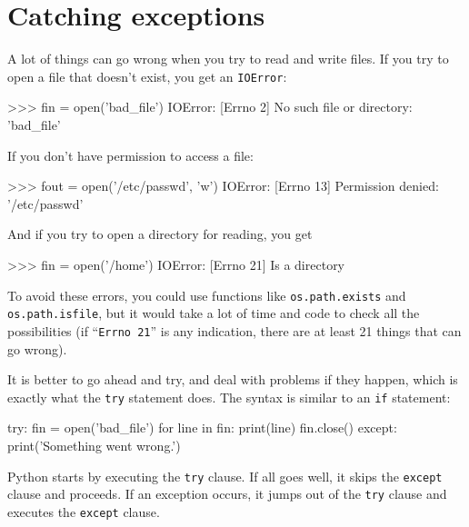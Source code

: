 \section{Catching exceptions}
\label{catch}

A lot of things can go wrong when you try to read and write
files.  If you try to open a file that doesn't exist, you get an
{\tt IOError}:


\beforeverb
\begin{pyinterpreter}
>>> fin = open('bad_file')
IOError: [Errno 2] No such file or directory: 'bad_file'
\end{pyinterpreter}
\afterverb
%
If you don't have permission to access a file:


\beforeverb
\begin{pyinterpreter}
>>> fout = open('/etc/passwd', 'w')
IOError: [Errno 13] Permission denied: '/etc/passwd'
\end{pyinterpreter}
\afterverb
%
And if you try to open a directory for reading, you get

\beforeverb
\begin{pyinterpreter}
>>> fin = open('/home')
IOError: [Errno 21] Is a directory
\end{pyinterpreter}
\afterverb
%
To avoid these errors, you could use functions like {\tt os.path.exists}
and {\tt os.path.isfile}, but it would take a lot of time and code
to check all the possibilities (if ``{\tt Errno 21}'' is any
indication, there are at least 21 things that can go wrong).


It is better to go ahead and try, and deal with problems if they
happen, which is exactly what the {\tt try} statement does.  The
syntax is similar to an {\tt if} statement:

\beforeverb
\begin{pycode}
try:    
    fin = open('bad_file')
    for line in fin:
        print(line)
    fin.close()
except:
    print('Something went wrong.')
\end{pycode}
\afterverb
%
Python starts by executing the {\tt try} clause.  If all goes
well, it skips the {\tt except} clause and proceeds.  If an
exception occurs, it jumps out of the {\tt try} clause and
executes the {\tt except} clause.

